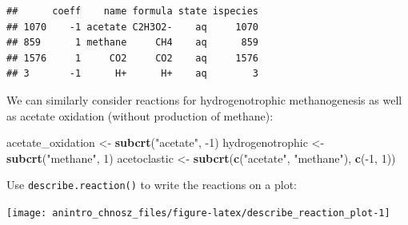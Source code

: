 \documentclass[]{tufte-handout}
\newenvironment{Shaded}{}{}
\newcommand{\KeywordTok}[1]{\textcolor[rgb]{0.00,0.44,0.13}{\textbf{#1}}}
\newcommand{\DecValTok}[1]{\textcolor[rgb]{0.25,0.63,0.44}{#1}}
\newcommand{\StringTok}[1]{\textcolor[rgb]{0.25,0.44,0.63}{#1}}
\newcommand{\OperatorTok}[1]{\textcolor[rgb]{0.40,0.40,0.40}{#1}}
\newcommand{\NormalTok}[1]{#1}
\begin{document}
\begin{verbatim}
##      coeff    name formula state ispecies
## 1070    -1 acetate C2H3O2-    aq     1070
## 859      1 methane     CH4    aq      859
## 1576     1     CO2     CO2    aq     1576
## 3       -1      H+      H+    aq        3
\end{verbatim}

We can similarly consider reactions for hydrogenotrophic methanogenesis
as well as acetate oxidation (without production of methane):

\begin{Shaded}
\begin{Highlighting}[]
\NormalTok{acetate_oxidation <-}\StringTok{ }\KeywordTok{subcrt}\NormalTok{(}\StringTok{"acetate"}\NormalTok{, }\OperatorTok{-}\DecValTok{1}\NormalTok{)}
\NormalTok{hydrogenotrophic <-}\StringTok{ }\KeywordTok{subcrt}\NormalTok{(}\StringTok{"methane"}\NormalTok{, }\DecValTok{1}\NormalTok{)}
\NormalTok{acetoclastic <-}\StringTok{ }\KeywordTok{subcrt}\NormalTok{(}\KeywordTok{c}\NormalTok{(}\StringTok{"acetate"}\NormalTok{, }\StringTok{"methane"}\NormalTok{), }\KeywordTok{c}\NormalTok{(}\OperatorTok{-}\DecValTok{1}\NormalTok{, }\DecValTok{1}\NormalTok{))}
\end{Highlighting}
\end{Shaded}

Use {\texttt{describe.reaction()}} to write the reactions on a plot:

\begin{marginfigure}
\texttt{[image: anintro\_chnosz\_files/figure-latex/describe\_reaction\_plot-1]} \end{marginfigure}
\end{document}
